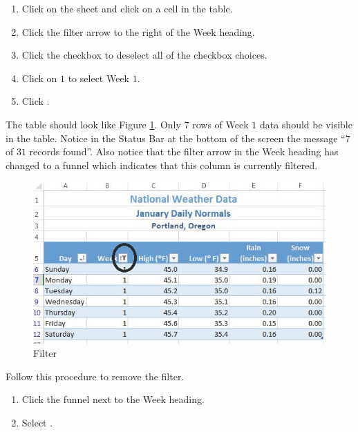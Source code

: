 \begin{enumerate}
	\item Click on the  sheet and click on a cell in the table.
	\item Click the filter arrow to the right of the Week heading.
	\item Click the  checkbox to deselect all of the checkbox choices.
	\item Click on $ 1 $ to select Week $ 1 $.
	\item Click .
\end{enumerate}

The table should look like Figure \ref{05:fig16}. Only $ 7 $ rows of Week $ 1 $ data should be visible in the table. Notice in the Status Bar at the bottom of the screen the message ``$ 7 $ of $ 31 $ records found''. Also notice that the filter arrow in the Week heading has changed to a funnel which indicates that this column is currently filtered.

\begin{figure}[H]
	\centering
	\includegraphics[width=\maxwidth{.95\linewidth}]{gfx/ch05_fig16}
	\caption{Filter}
	\label{05:fig16}
\end{figure}

Follow this procedure to remove the filter.

\begin{enumerate}
	\item Click the funnel next to the Week heading.
	\item Select .
\end{enumerate}

